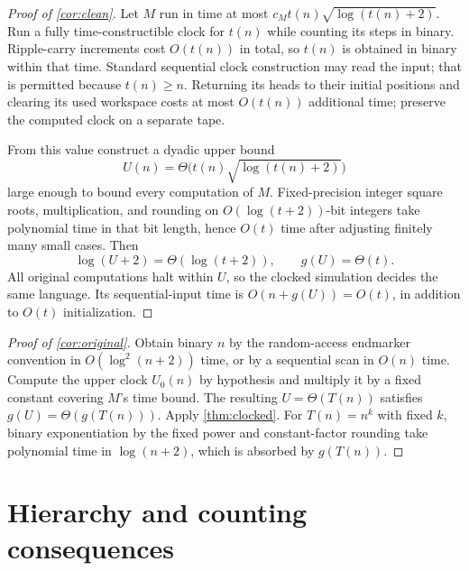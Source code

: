 \documentclass[11pt]{article}
\theoremstyle{definition}
\theoremstyle{remark}
\begin{document}
\begin{proof}[Proof of \cref{cor:clean}]
Let $M$ run in time at most $c_Mt(n)\sqrt{\log(t(n)+2)}$. Run a fully time-constructible clock for $t(n)$ while counting its steps in binary. Ripple-carry increments cost $O(t(n))$ in total, so $t(n)$ is obtained in binary within that time. Standard sequential clock construction may read the input; that is permitted because $t(n)\ge n$. Returning its heads to their initial positions and clearing its used workspace costs at most $O(t(n))$ additional time; preserve the computed clock on a separate tape.

From this value construct a dyadic upper bound
\[
 U(n)=\Theta\bigl(t(n)\sqrt{\log(t(n)+2)}\bigr)
\]
large enough to bound every computation of $M$. Fixed-precision integer square roots, multiplication, and rounding on $O(\log(t+2))$-bit integers take polynomial time in that bit length, hence $O(t)$ time after adjusting finitely many small cases. Then
\[
 \log(U+2)=\Theta(\log(t+2)),\qquad g(U)=\Theta(t).
\]
All original computations halt within $U$, so the clocked simulation decides the same language. Its sequential-input time is $O(n+g(U))=O(t)$, in addition to $O(t)$ initialization.
\end{proof}

\begin{proof}[Proof of \cref{cor:original}]
Obtain binary $n$ by the random-access endmarker convention in $O(\log^2(n+2))$ time, or by a sequential scan in $O(n)$ time. Compute the upper clock $U_0(n)$ by hypothesis and multiply it by a fixed constant covering $M$'s time bound. The resulting $U=\Theta(T(n))$ satisfies $g(U)=\Theta(g(T(n)))$. Apply \cref{thm:clocked}. For $T(n)=n^k$ with fixed $k$, binary exponentiation by the fixed power and constant-factor rounding take polynomial time in $\log(n+2)$, which is absorbed by $g(T(n))$.
\end{proof}

\section{Hierarchy and counting consequences}\label{sec:consequences}
\end{document}
